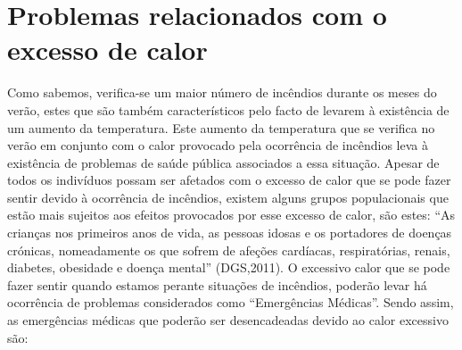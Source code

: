 \documentclass{report}
\begin{document}
\section{Problemas relacionados com o excesso de calor}
\cite{dgsriscos}

Como sabemos, verifica-se um maior número de incêndios durante os meses do verão, estes que são também característicos pelo facto de levarem à existência de um aumento da temperatura. Este aumento da temperatura que se verifica no verão em conjunto com o calor provocado pela ocorrência de incêndios leva à existência de problemas de saúde pública associados a essa situação.
Apesar de todos os indivíduos possam ser afetados com o excesso de calor que se pode fazer sentir devido à ocorrência de incêndios, existem alguns grupos populacionais que estão mais sujeitos aos efeitos provocados por esse excesso de calor, são estes: “As crianças nos primeiros anos de vida, as pessoas idosas e os portadores de doenças crónicas, nomeadamente os que sofrem de afeções cardíacas, respiratórias, renais, diabetes, obesidade e doença mental” (DGS,2011).
O excessivo calor que se pode fazer sentir quando estamos perante situações de incêndios, poderão levar há ocorrência de problemas considerados como “Emergências Médicas”. Sendo assim, as emergências médicas que poderão ser desencadeadas devido ao calor excessivo são:
\end{document}
